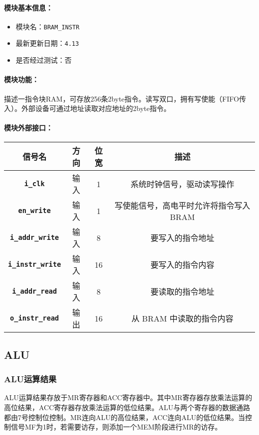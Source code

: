 \documentclass[lang=cn,a4paper,newtx]{elegantpaper}
\begin{document}
\paragraph{模块基本信息：}
\begin{itemize}
  \item 模块名：\texttt{BRAM\_INSTR}
  \item 最新更新日期：\texttt{4.13}
  \item 是否经过测试：否
\end{itemize}
\paragraph{模块功能：}
描述一指令块RAM，可存放256条2byte指令。读写双口，拥有写使能（FIFO传入）。外部设备可通过地址读取对应地址的2byte指令。
\paragraph{模块外部接口：}
\begin{longtable}{>{\bfseries}c c c c}
  \toprule
  信号名 & 方向 & 位宽 & 描述 \\
  \midrule
  \endhead

  \texttt{i\_clk}          & 输入  & 1        & 系统时钟信号，驱动读写操作 \\
  \texttt{en\_write}       & 输入  & 1        & 写使能信号，高电平时允许将指令写入 BRAM \\
  \texttt{i\_addr\_write}  & 输入  & 8        & 要写入的指令地址 \\
  \texttt{i\_instr\_write} & 输入  & 16       & 要写入的指令内容 \\
  \texttt{i\_addr\_read}   & 输入  & 8        & 要读取的指令地址 \\
  \texttt{o\_instr\_read}  & 输出  & 16       & 从 BRAM 中读取的指令内容 \\
  \bottomrule
\end{longtable}

\subsection{ALU}
\subsubsection{ALU运算结果}
ALU运算结果存放于MR寄存器和ACC寄存器中。其中MR寄存器存放乘法运算的高位结果，ACC寄存器存放乘法运算的低位结果。ALU与两个寄存器的数据通路都由7号控制位控制。MR连向ALU的高位结果，ACC连向ALU的低位结果。当控制信号MF为1时，若需要访存，则添加一个MEM阶段进行MR的访存。
\end{document}
